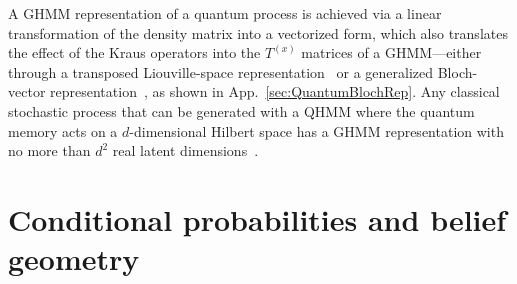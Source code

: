 \documentclass[prx,nofootinbib,onecolumn,showkeys,groupaddress,preprintnumbers,floatfix,
superscriptaddress]{revtex4-1}
\newcommand{\tr}{\text{tr}}
\begin{document}

A GHMM representation of a quantum process is achieved via a linear transformation of the density matrix into a vectorized form, which also translates the effect of the Kraus operators into the $T^{(x)}$ matrices of a GHMM---either through a transposed Liouville-space representation~\cite{Gyamfi2020fundamentals}
or a generalized Bloch-vector representation~\cite{Riec24_Ideal},
as shown in App.~\ref{sec:QuantumBlochRep}.
Any classical stochastic process that can be generated with a QHMM where the quantum memory acts on a $d$-dimensional Hilbert space has a GHMM representation with no more than $d^2$ real latent dimensions~\cite{Riechers25_Identifiability}.







\section{Conditional probabilities and belief geometry}
\label{sec:ConditionalProbs}
\end{document}
